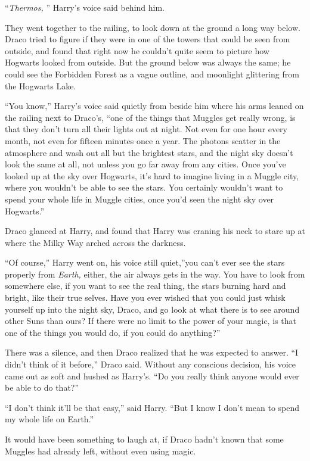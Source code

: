 ``\emph{Thermos,} '' Harry's voice said behind him.

They went together to the railing, to look down at the ground a long way
below. Draco tried to figure if they were in one of the towers that
could be seen from outside, and found that right now he couldn't quite
seem to picture how Hogwarts looked from outside. But the ground below
was always the same; he could see the Forbidden Forest as a vague
outline, and moonlight glittering from the Hogwarts Lake.

``You know,'' Harry's voice said quietly from beside him where his arms
leaned on the railing next to Draco's, ``one of the things that Muggles
get really wrong, is that they don't turn all their lights out at night.
Not even for one hour every month, not even for fifteen minutes once a
year. The photons scatter in the atmosphere and wash out all but the
brightest stars, and the night sky doesn't look the same at all, not
unless you go far away from any cities. Once you've looked up at the sky
over Hogwarts, it's hard to imagine living in a Muggle city, where you
wouldn't be able to see the stars. You certainly wouldn't want to spend
your whole life in Muggle cities, once you'd seen the night sky over
Hogwarts.''

Draco glanced at Harry, and found that Harry was craning his neck to
stare up at where the Milky Way arched across the darkness.

``Of course,'' Harry went on, his voice still quiet,''you can't ever see
the stars properly from \emph{Earth,} either, the air always gets in the
way. You have to look from somewhere else, if you want to see the real
thing, the stars burning hard and bright, like their true selves. Have
you ever wished that you could just whisk yourself up into the night
sky, Draco, and go look at what there is to see around other Suns than
ours? If there were no limit to the power of your magic, is that one of
the things you would do, if you could do anything?''

There was a silence, and then Draco realized that he was expected to
answer. ``I didn't think of it before,'' Draco said. Without any
conscious decision, his voice came out as soft and hushed as Harry's.
``Do you really think anyone would ever be able to do that?''

``I don't think it'll be that easy,'' said Harry. ``But I know I don't
mean to spend my whole life on Earth.''

It would have been something to laugh at, if Draco hadn't known that
some Muggles had already left, without even using magic.

